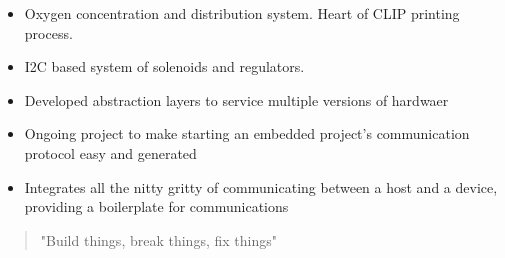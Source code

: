\documentclass[10pt,a4paper,ragged2e,withhyper]{altacv}
\begin{document}
\begin{paracol}{2}
\divider

\begin{itemize}
\item Oxygen concentration and distribution system. Heart of CLIP printing process.
\item I2C based system of solenoids and regulators.
\item Developed abstraction layers to service multiple versions of hardwaer
\end{itemize}
\divider

\begin{itemize}
\item Ongoing project to make starting an embedded project's communication protocol easy and generated
\item Integrates all the nitty gritty of communicating between a host and a device, providing a boilerplate for communications
\end{itemize}

\switchcolumn


\begin{quote}
"Build things, break things, fix things"
\end{quote}







\medskip


\end{paracol}
\end{document}
